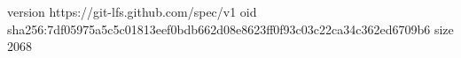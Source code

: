 version https://git-lfs.github.com/spec/v1
oid sha256:7df05975a5c5c01813eef0bdb662d08e8623ff0f93c03c22ca34c362ed6709b6
size 2068
